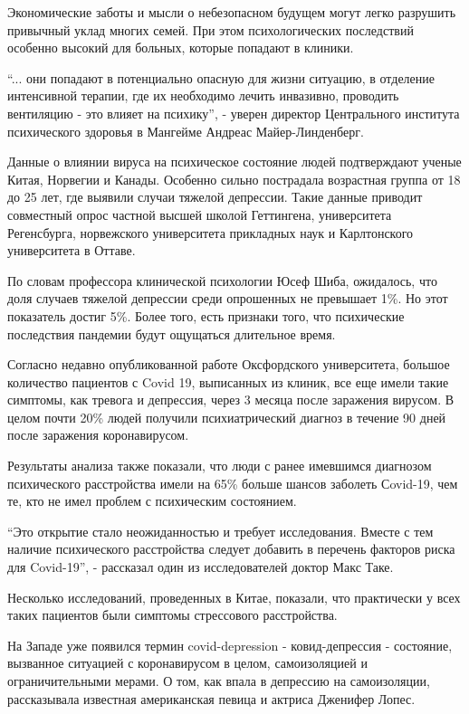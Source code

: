 Экономические заботы и мысли о небезопасном будущем могут легко разрушить
привычный уклад многих семей. При этом психологических последствий
особенно высокий для больных, которые попадают в клиники.

\enquote{... они попадают в потенциально опасную для жизни ситуацию, в отделение
интенсивной терапии, где их необходимо лечить инвазивно, проводить
вентиляцию - это влияет на психику}, - уверен директор Центрального
института психического здоровья в Мангейме Андреас Майер-Линденберг.

Данные о влиянии вируса на психическое состояние людей подтверждают ученые
Китая, Норвегии и Канады. Особенно сильно пострадала возрастная группа от
18 до 25 лет, где выявили случаи тяжелой депрессии. Такие данные приводит
совместный опрос частной высшей школой Геттингена, университета
Регенсбурга, норвежского университета прикладных наук и Карлтонского
университета в Оттаве.

По словам профессора клинической психологии Юсеф Шиба, ожидалось, что доля
случаев тяжелой депрессии среди опрошенных не превышает 1\%. Но этот
показатель достиг 5\%. Более того, есть признаки того, что психические
последствия пандемии будут ощущаться длительное время.

Согласно недавно опубликованной работе Оксфордского университета, большое
количество пациентов с Covid 19, выписанных из клиник, все еще имели такие
симптомы, как тревога и депрессия, через 3 месяца после заражения вирусом.
В целом почти 20\% людей получили психиатрический диагноз в течение 90 дней
после заражения коронавирусом.

Результаты анализа также показали, что люди с ранее имевшимся диагнозом
психического расстройства имели на 65\% больше шансов заболеть Сovid-19,
чем те, кто не имел проблем с психическим состоянием.

\enquote{Это открытие стало неожиданностью и требует исследования. Вместе с тем
наличие психического расстройства следует добавить в перечень факторов
риска для Covid-19}, - рассказал один из исследователей доктор Макс Таке.

Несколько исследований, проведенных в Китае, показали, что практически у
всех таких пациентов были симптомы стрессового расстройства.

На Западе уже появился термин covid-depression - ковид-депрессия -
состояние, вызванное ситуацией с коронавирусом в целом, самоизоляцией и
ограничительными мерами. О том, как впала в депрессию на самоизоляции,
рассказывала известная американская певица и актриса Дженифер Лопес.  


